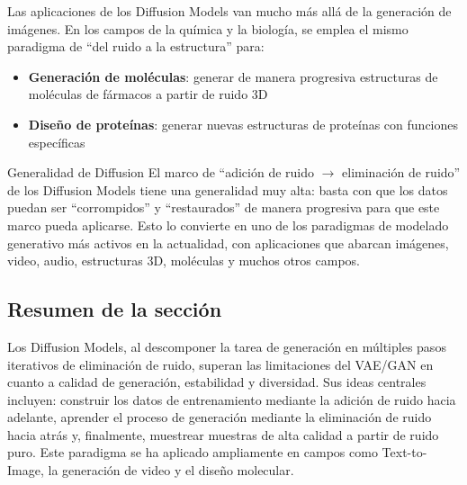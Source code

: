 Las aplicaciones de los Diffusion Models van mucho más allá de la generación de imágenes. En los campos de la química y la biología, se emplea el mismo paradigma de ``del ruido a la estructura'' para:
\begin{itemize}
    \item \textbf{Generación de moléculas}: generar de manera progresiva estructuras de moléculas de fármacos a partir de ruido 3D
    \item \textbf{Diseño de proteínas}: generar nuevas estructuras de proteínas con funciones específicas
\end{itemize}

\begin{knowledgebox}{Generalidad de Diffusion}
El marco de ``adición de ruido $\rightarrow$ eliminación de ruido'' de los Diffusion Models tiene una generalidad muy alta: basta con que los datos puedan ser ``corrompidos'' y ``restaurados'' de manera progresiva para que este marco pueda aplicarse. Esto lo convierte en uno de los paradigmas de modelado generativo más activos en la actualidad, con aplicaciones que abarcan imágenes, video, audio, estructuras 3D, moléculas y muchos otros campos.
\end{knowledgebox}

\subsection{Resumen de la sección}

Los Diffusion Models, al descomponer la tarea de generación en múltiples pasos iterativos de eliminación de ruido, superan las limitaciones del VAE/GAN en cuanto a calidad de generación, estabilidad y diversidad. Sus ideas centrales incluyen: construir los datos de entrenamiento mediante la adición de ruido hacia adelante, aprender el proceso de generación mediante la eliminación de ruido hacia atrás y, finalmente, muestrear muestras de alta calidad a partir de ruido puro. Este paradigma se ha aplicado ampliamente en campos como Text-to-Image, la generación de video y el diseño molecular.

